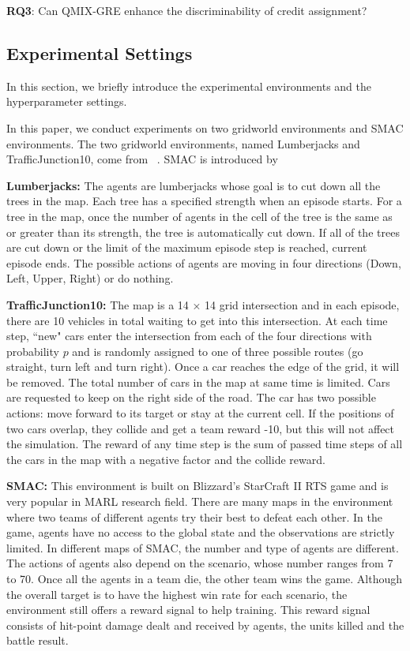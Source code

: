 \textbf{RQ3}: Can QMIX-GRE enhance the discriminability of credit assignment?

\subsection{Experimental Settings}
In this section, we briefly introduce the experimental environments and the hyperparameter settings.

In this paper, we conduct experiments on two gridworld environments and SMAC environments.
The two gridworld environments, named Lumberjacks and TrafficJunction10, come from ~\cite{magym}.
SMAC is introduced by ~\cite{samvelyan19smac}

\textbf{Lumberjacks:}
The agents are lumberjacks whose goal is to cut down all the trees in the map. 
Each tree has a specified strength when an episode starts. 
For a tree in the map, once the number of agents in the cell of the tree is the same as or greater than its strength, the tree is automatically cut down. 
If all of the trees are cut down or the limit of the maximum episode step is reached, current episode ends.
The possible actions of agents are moving in four directions (Down, Left, Upper, Right) or do nothing.

\textbf{TrafficJunction10:}
The map is a 14 × 14 grid intersection and in each episode, there are 10 vehicles in total waiting to get into this intersection.
At each time step, ``new" cars enter the intersection from each of the four directions with probability $p$ and is randomly assigned to one of three possible routes (go straight, turn left and turn right).
Once a car reaches the edge of the grid, it will be removed. 
The total number of cars in the map at same time is limited. 
Cars are requested to keep on the right side of the road.
The car has two possible actions: move forward to its target or stay at the current cell. 
If the positions of two cars overlap, they collide and get a team reward -10, but this will not affect the simulation.
The reward of any time step is the sum of passed time steps of all the cars in the map with a negative factor and the collide reward.

\textbf{SMAC:}
This environment is built on Blizzard's StarCraft II RTS game and is very popular in MARL research field.
There are many maps in the environment where two teams of different agents try their best to defeat each other.
In the game, agents have no access to the global state and the observations are strictly limited.
In different maps of SMAC, the number and type of agents are different.
The actions of agents also depend on the scenario, whose number ranges from 7 to 70.
Once all the agents in a team die, the other team wins the game.
Although the overall target is to have the highest win rate for each scenario, the environment still offers a reward signal to help training.
This reward signal consists of hit-point damage dealt and received by agents, the units killed and the battle result.


